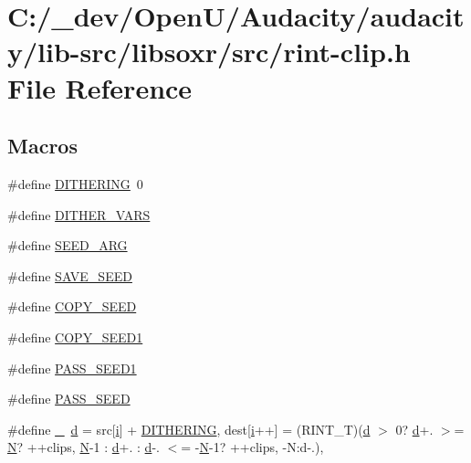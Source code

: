 \hypertarget{rint-clip_8h}{}\section{C\+:/\+\_\+dev/\+Open\+U/\+Audacity/audacity/lib-\/src/libsoxr/src/rint-\/clip.h File Reference}
\label{rint-clip_8h}
\subsection*{Macros}
\begin{DoxyCompactItemize}
\item 
\#define \hyperlink{rint-clip_8h_a24bf398cdd15a6dd8f31cd2a63054b71}{D\+I\+T\+H\+E\+R\+I\+NG}~0
\item 
\#define \hyperlink{rint-clip_8h_afec60e277fd22cd1ae37731b408781fd}{D\+I\+T\+H\+E\+R\+\_\+\+V\+A\+RS}
\item 
\#define \hyperlink{rint-clip_8h_a0dc312052e5cf5a3662fae7273cad7a0}{S\+E\+E\+D\+\_\+\+A\+RG}
\item 
\#define \hyperlink{rint-clip_8h_adf713e14be7fe2d4bbcc56238fcb5b7e}{S\+A\+V\+E\+\_\+\+S\+E\+ED}
\item 
\#define \hyperlink{rint-clip_8h_a936d47091150a6712d9a08c4b8a7a7d0}{C\+O\+P\+Y\+\_\+\+S\+E\+ED}
\item 
\#define \hyperlink{rint-clip_8h_ad288805e0607fc3ecc0d4846ea814e7f}{C\+O\+P\+Y\+\_\+\+S\+E\+E\+D1}
\item 
\#define \hyperlink{rint-clip_8h_a62b088eb5d7a462e39f134224244f6ea}{P\+A\+S\+S\+\_\+\+S\+E\+E\+D1}
\item 
\#define \hyperlink{rint-clip_8h_a477d3204a924b363b85a3a9e00dac0ca}{P\+A\+S\+S\+\_\+\+S\+E\+ED}
\item 
\#define \hyperlink{rint-clip_8h_ae4dfd7b0d66121016d6466d2ff10e8ba}{\+\_\+}~\hyperlink{poly-fir_8h_a2530554172d8629149ec56816eeaa947}{d} = src\mbox{[}\hyperlink{checksum_8c_ab80e330a3bc9e38c1297fe17381e92b4}{i}\mbox{]} + \hyperlink{rint-clip_8h_a24bf398cdd15a6dd8f31cd2a63054b71}{D\+I\+T\+H\+E\+R\+I\+NG}, dest\mbox{[}\hyperlink{checksum_8c_ab80e330a3bc9e38c1297fe17381e92b4}{i}++\mbox{]} = (R\+I\+N\+T\+\_\+T)(\hyperlink{poly-fir_8h_a2530554172d8629149ec56816eeaa947}{d} $>$ 0? \hyperlink{poly-fir_8h_a2530554172d8629149ec56816eeaa947}{d}+. $>$= \hyperlink{rfft2d_test_m_l_8m_af6d1246b147a7c5763d9fc83082020ff}{N}? ++clips, \hyperlink{rfft2d_test_m_l_8m_af6d1246b147a7c5763d9fc83082020ff}{N}-\/1 \+: \hyperlink{poly-fir_8h_a2530554172d8629149ec56816eeaa947}{d}+. \+: \hyperlink{poly-fir_8h_a2530554172d8629149ec56816eeaa947}{d}-\/. $<$= -\/\hyperlink{rfft2d_test_m_l_8m_af6d1246b147a7c5763d9fc83082020ff}{N}-\/1? ++clips, -\/N\+:d-\/.),

\end{DoxyCompactItemize}

